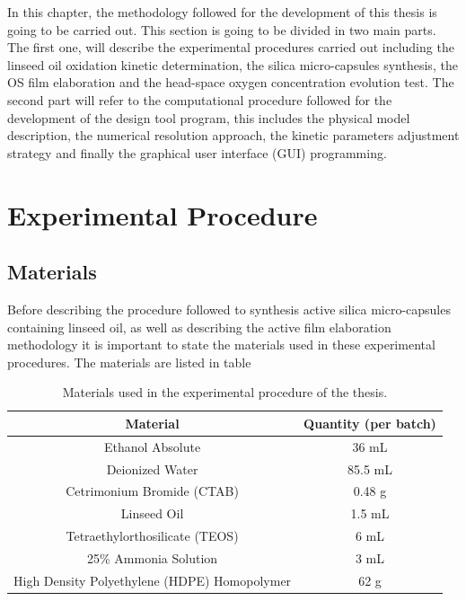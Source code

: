 \begin{refsection}
In this chapter, the methodology followed for the development of this thesis is going to be carried out. This section is going to be divided in two main parts. The first one, will describe the experimental procedures carried out including the linseed oil oxidation kinetic determination, the silica micro-capsules synthesis, the OS film elaboration and the head-space oxygen concentration evolution test. The second part will refer to the computational procedure followed for the development of the design tool program, this includes the physical model description, the numerical resolution approach, the kinetic parameters adjustment strategy and finally the graphical user interface (GUI) programming. 

\section[Exp.Procedure]{Experimental Procedure}
\subsection{Materials}\label{subsec:materials}
Before describing the procedure followed to synthesis active silica micro-capsules containing linseed oil, as well as describing the active film elaboration methodology it is important to state the materials used in these experimental procedures. The materials are listed in table 

\begin{table}[h]
\centering
\caption{Materials used in the experimental procedure of the thesis.}
\label{tab:my-table}
\begin{tabular}{|c|c|}
\hline
Material                        & Quantity (per batch) \\ \hline
Ethanol  Absolute               & 36 mL                \\ \hline
Deionized  Water                & 85.5 mL              \\ \hline
Cetrimonium  Bromide (CTAB)     & 0.48 g               \\ \hline
Linseed  Oil                    & 1.5 mL               \\ \hline
Tetraethylorthosilicate  (TEOS) & 6 mL                 \\ \hline
25\% Ammonia Solution           & 3 mL                 \\ \hline
High Density Polyethylene (HDPE) Homopolymer & 62 g            \\ \hline
\end{tabular}
\end{table}




\end{refsection}
